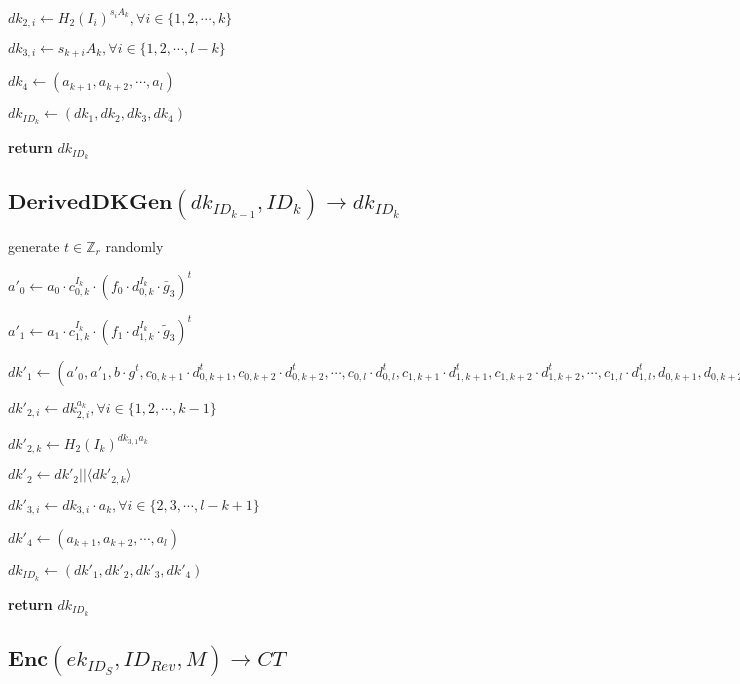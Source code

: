 \documentclass[a4paper]{article}
\begin{document}
$\textit{dk}_{2, i} \gets H_2(I_i)^{s_i A_k}, \forall i \in \{1, 2, \cdots, k\}$

$\textit{dk}_{3, i} \gets s_{k + i}A_k, \forall i \in \{1, 2, \cdots, l - k\}$

$\textit{dk}_4 \gets (a_{k + 1}, a_{k + 2}, \cdots, a_l)$

$\textit{dk}_{\textit{ID}_k} \gets (\textit{dk}_1, \textit{dk}_2, \textit{dk}_3, \textit{dk}_4)$

\textbf{return} $\textit{dk}_{\textit{ID}_k}$

\subsection{$\textbf{DerivedDKGen}(\textit{dk}_{\textit{ID}_{k - 1}}, \textit{ID}_k) \rightarrow \textit{dk}_{\textit{ID}_k}$}

generate $t \in \mathbb{Z}_r$ randomly

$a'_0 \gets a_0 \cdot c_{0, k}^{I_k} \cdot (f_0 \cdot d_{0, k}^{I_k} \cdot \bar{g}_3)^t$

$a'_1 \gets a_1 \cdot c_{1, k}^{I_k} \cdot (f_1 \cdot d_{1, k}^{I_k} \cdot \tilde{g}_3)^t$

$\textit{dk}'_1 \gets (
a'_0, a'_1, b \cdot g^t, 
c_{0, k + 1} \cdot d_{0, k + 1}^t, c_{0, k + 2} \cdot d_{0, k + 2}^t, \cdots, c_{0, l} \cdot d_{0, l}^t, 
c_{1, k + 1} \cdot d_{1, k + 1}^t, c_{1, k + 2} \cdot d_{1, k + 2}^t, \cdots, c_{1, l} \cdot d_{1, l}^t, 
d_{0, k + 1}, d_{0, k + 2}, \cdots, d_{0, l}, 
d_{1, k + 1}, d_{1, k + 2}, \cdots, d_{1, l}, 
f_0 \cdot c_{0, k}^{I_k}, f_1 \cdot c_{1, k}^{I_k}
)$

$\textit{dk}'_{2, i} \gets \textit{dk}_{2, i}^{a_k}, \forall i \in \{1, 2, \cdots, k - 1\}$

$\textit{dk}'_{2, k} \gets H_2(I_k)^{\textit{dk}_{3, 1} a_k}$

$\textit{dk}'_2 \gets \textit{dk}'_2 || \langle\textit{dk}'_{2, k}\rangle$

$\textit{dk}'_{3, i} \gets \textit{dk}_{3, i} \cdot a_k, \forall i \in \{2, 3, \cdots, l - k + 1\}$

$\textit{dk}'_4 \gets (a_{k + 1}, a_{k + 2}, \cdots, a_l)$

$\textit{dk}_{\textit{ID}_k} \gets (\textit{dk}'_1, \textit{dk}'_2, \textit{dk}'_3, \textit{dk}'_4)$

\textbf{return} $\textit{dk}_{\textit{ID}_k}$

\subsection{$\textbf{Enc}(\textit{ek}_{\textit{ID}_S}, \textit{ID}_\textit{Rev}, M) \rightarrow \textit{CT}$}
\end{document}
